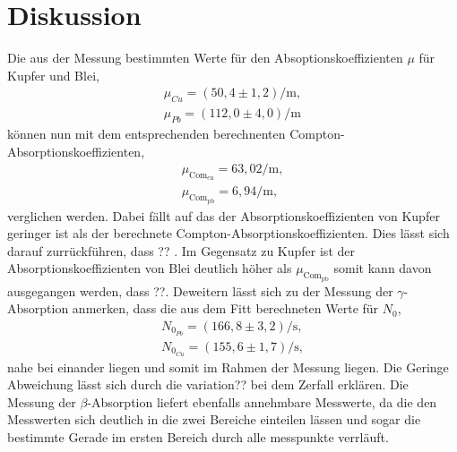 \newpage
\section{Diskussion}
\label{sec:Diskussion}
Die aus der Messung bestimmten Werte für den Absoptionskoeffizienten $\mu$
für Kupfer und Blei,
\begin{align*}
\mu_{Cu}=(50,4\pm1,2)\si{\per\meter},\\
\mu_{Pb}=(112,0\pm4,0)\si{\per\meter}
\end{align*}
können nun mit dem entsprechenden berechnenten Compton-Absorptionskoeffizienten,
\begin{align*}
  \mu_\mathrm{Com_{cu}}={63,02\si{\per\meter}},\\
  \mu_\mathrm{Com_{pb}}={6,94\si{\per\meter}},
\end{align*}
verglichen werden.
Dabei fällt auf das der Absorptionskoeffizienten von Kupfer
geringer ist als der berechnete Compton-Absorptionskoeffizienten.
Dies lässt sich darauf zurrückführen, dass ?? .
Im Gegensatz zu Kupfer ist der Absorptionskoeffizienten von Blei deutlich höher
als $\mu_\mathrm{Com_{pb}}$ somit kann davon ausgegangen werden, dass ??.
Deweitern lässt sich zu der Messung der $\gamma$-Absorption anmerken, dass
die aus dem Fitt berechneten Werte für $N_0$,
\begin{align*}
  N_{0_{Pb}}=(166,8\pm3,2)\si{\per\second},\\
  N_{0_{Cu}}=(155,6\pm1,7)\si{\per\second},
\end{align*}
nahe bei einander liegen und somit im Rahmen der Messung liegen. Die Geringe Abweichung lässt
sich durch die variation?? bei dem Zerfall erklären.
Die Messung der $\beta$-Absorption liefert ebenfalls annehmbare Messwerte, da
die den Messwerten sich deutlich in die zwei Bereiche einteilen lässen
und sogar die bestimmte Gerade im ersten Bereich durch alle messpunkte verrläuft.
